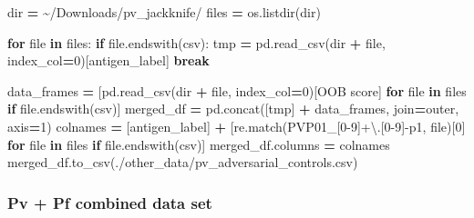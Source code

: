 \documentclass[
  11pt,
  oneside]{book}
\newenvironment{Shaded}{\begin{snugshade}}{\end{snugshade}}
\newcommand{\BuiltInTok}[1]{#1}
\newcommand{\ControlFlowTok}[1]{\textcolor[rgb]{0.13,0.29,0.53}{\textbf{#1}}}
\newcommand{\DecValTok}[1]{\textcolor[rgb]{0.00,0.00,0.81}{#1}}
\newcommand{\KeywordTok}[1]{\textcolor[rgb]{0.13,0.29,0.53}{\textbf{#1}}}
\newcommand{\NormalTok}[1]{#1}
\newcommand{\OperatorTok}[1]{\textcolor[rgb]{0.81,0.36,0.00}{\textbf{#1}}}
\newcommand{\StringTok}[1]{\textcolor[rgb]{0.31,0.60,0.02}{#1}}
\begin{document}
\begin{Shaded}
\begin{Highlighting}[]
\BuiltInTok{dir} \OperatorTok{=} \StringTok{\textquotesingle{}\textasciitilde{}/Downloads/pv\_jackknife/\textquotesingle{}}
\NormalTok{files }\OperatorTok{=}\NormalTok{ os.listdir(}\BuiltInTok{dir}\NormalTok{)}

\ControlFlowTok{for} \BuiltInTok{file} \KeywordTok{in}\NormalTok{ files:}
    \ControlFlowTok{if} \BuiltInTok{file}\NormalTok{.endswith(}\StringTok{\textquotesingle{}csv\textquotesingle{}}\NormalTok{):}
\NormalTok{        tmp }\OperatorTok{=}\NormalTok{ pd.read\_csv(}\BuiltInTok{dir} \OperatorTok{+} \BuiltInTok{file}\NormalTok{, index\_col}\OperatorTok{=}\DecValTok{0}\NormalTok{)[}\StringTok{\textquotesingle{}antigen\_label\textquotesingle{}}\NormalTok{]}
        \ControlFlowTok{break}

\NormalTok{data\_frames }\OperatorTok{=}\NormalTok{ [pd.read\_csv(}\BuiltInTok{dir} \OperatorTok{+} \BuiltInTok{file}\NormalTok{, index\_col}\OperatorTok{=}\DecValTok{0}\NormalTok{)[}\StringTok{\textquotesingle{}OOB score\textquotesingle{}}\NormalTok{] }\ControlFlowTok{for} \BuiltInTok{file} \KeywordTok{in}\NormalTok{ files }\ControlFlowTok{if} \BuiltInTok{file}\NormalTok{.endswith(}\StringTok{\textquotesingle{}csv\textquotesingle{}}\NormalTok{)]}
\NormalTok{merged\_df }\OperatorTok{=}\NormalTok{ pd.concat([tmp] }\OperatorTok{+}\NormalTok{ data\_frames, join}\OperatorTok{=}\StringTok{\textquotesingle{}outer\textquotesingle{}}\NormalTok{, axis}\OperatorTok{=}\DecValTok{1}\NormalTok{)}
\NormalTok{colnames }\OperatorTok{=}\NormalTok{ [}\StringTok{\textquotesingle{}antigen\_label\textquotesingle{}}\NormalTok{] }\OperatorTok{+}\NormalTok{ [re.match(}\StringTok{\textquotesingle{}PVP01\_[0{-}9]+\textbackslash{}.[0{-}9]{-}p1\textquotesingle{}}\NormalTok{, }\BuiltInTok{file}\NormalTok{)[}\DecValTok{0}\NormalTok{] }\ControlFlowTok{for} \BuiltInTok{file} \KeywordTok{in}\NormalTok{ files }\ControlFlowTok{if} \BuiltInTok{file}\NormalTok{.endswith(}\StringTok{\textquotesingle{}csv\textquotesingle{}}\NormalTok{)]}
\NormalTok{merged\_df.columns }\OperatorTok{=}\NormalTok{ colnames}
\NormalTok{merged\_df.to\_csv(}\StringTok{\textquotesingle{}./other\_data/pv\_adversarial\_controls.csv\textquotesingle{}}\NormalTok{)}
\end{Highlighting}
\end{Shaded}

\hypertarget{pv-pf-combined-data-set-2}{%
\subsubsection{Pv + Pf combined data set}\label{pv-pf-combined-data-set-2}}
\end{document}

